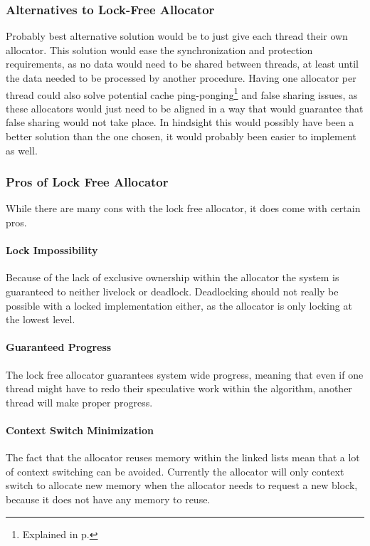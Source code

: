 \subsubsection{Alternatives to Lock-Free Allocator}
\label{subsubsec:lock_free_allocator_alternatives}
Probably best alternative solution would be to just give each thread their own allocator.
This solution would ease the synchronization and protection requirements, as no data would need to be shared between threads,
at least until the data needed to be processed by another procedure.
Having one allocator per thread could also solve potential cache ping-ponging\footnote{Explained in p.\pageref{detailed_lock_free_ping_pong}}
and false sharing issues, as these allocators
would just need to be aligned in a way that would guarantee that false sharing would not take place.
In hindsight this would possibly have been a better solution than the one chosen, it would probably been easier to implement as well.

\subsubsection{Pros of Lock Free Allocator}
While there are many cons with the lock free allocator, it does come with certain pros.

\paragraph{Lock Impossibility}
Because of the lack of exclusive ownership within the allocator the system is guaranteed to neither livelock or deadlock.
Deadlocking should not really be possible with a locked implementation either, as the allocator is only locking at the lowest level.

\paragraph{Guaranteed Progress}
The lock free allocator guarantees system wide progress, meaning that even if one thread might have to redo their speculative work
within the algorithm, another thread will make proper progress.

\paragraph{Context Switch Minimization}
The fact that the allocator reuses memory within the linked lists mean that a lot of context switching can be avoided.
Currently the allocator will only context switch to allocate new memory when the allocator needs to request a new block,
because it does not have any memory to reuse.

